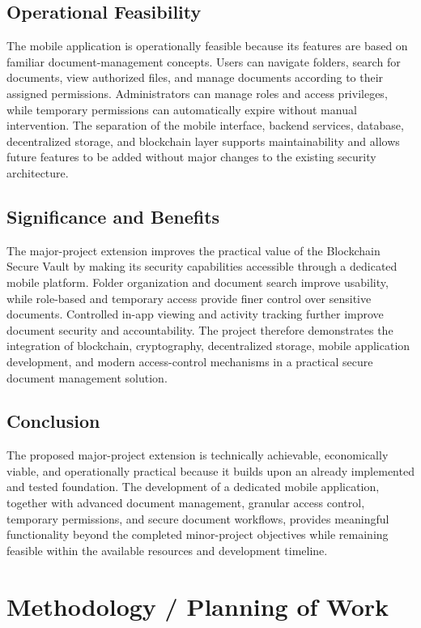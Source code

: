 \documentclass[12pt]{article}
\begin{document}
\subsection{Operational Feasibility}
The mobile application is operationally feasible because its features are based on familiar document-management concepts. Users can navigate folders, search for documents, view authorized files, and manage documents according to their assigned permissions. Administrators can manage roles and access privileges, while temporary permissions can automatically expire without manual intervention. The separation of the mobile interface, backend services, database, decentralized storage, and blockchain layer supports maintainability and allows future features to be added without major changes to the existing security architecture.

\subsection{Significance and Benefits}
The major-project extension improves the practical value of the Blockchain Secure Vault by making its security capabilities accessible through a dedicated mobile platform. Folder organization and document search improve usability, while role-based and temporary access provide finer control over sensitive documents. Controlled in-app viewing and activity tracking further improve document security and accountability. The project therefore demonstrates the integration of blockchain, cryptography, decentralized storage, mobile application development, and modern access-control mechanisms in a practical secure document management solution.

\subsection{Conclusion}
The proposed major-project extension is technically achievable, economically viable, and operationally practical because it builds upon an already implemented and tested foundation. The development of a dedicated mobile application, together with advanced document management, granular access control, temporary permissions, and secure document workflows, provides meaningful functionality beyond the completed minor-project objectives while remaining feasible within the available resources and development timeline.

\newpage
\section{Methodology / Planning of Work}
\end{document}
